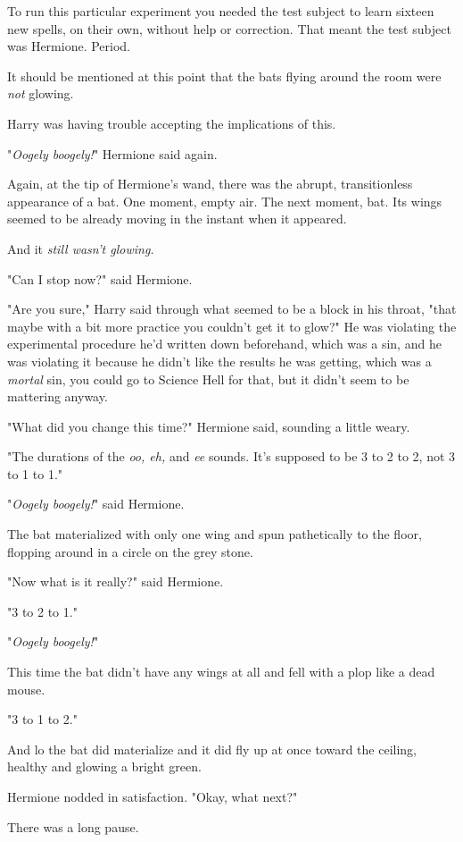 To run this particular experiment you needed the test subject to learn sixteen
new spells, on their own, without help or correction. That meant the test
subject was Hermione. Period.

It should be mentioned at this point that the bats flying around the room were
\emph{not} glowing.

Harry was having trouble accepting the implications of this.

"\emph{Oogely boogely!}" Hermione said again.

Again, at the tip of Hermione's wand, there was the abrupt, transitionless
appearance of a bat. One moment, empty air. The next moment, bat. Its wings
seemed to be already moving in the instant when it appeared.

And it \emph{still wasn't glowing.}

"Can I stop now?" said Hermione.

"Are you sure," Harry said through what seemed to be a block in his throat,
"that maybe with a bit more practice you couldn't get it to glow?" He was
violating the experimental procedure he'd written down beforehand, which was a
sin, and he was violating it because he didn't like the results he was getting,
which was a \emph{mortal} sin, you could go to Science Hell for that, but it
didn't seem to be mattering anyway.

"What did you change this time?" Hermione said, sounding a little weary.

"The durations of the \emph{oo, eh,} and \emph{ee} sounds. It's supposed to be
3 to 2 to 2, not 3 to 1 to 1."

"\emph{Oogely boogely!}" said Hermione.

The bat materialized with only one wing and spun pathetically to the floor,
flopping around in a circle on the grey stone.

"Now what is it really?" said Hermione.

"3 to 2 to 1."

"\emph{Oogely boogely!}"

This time the bat didn't have any wings at all and fell with a plop like a dead
mouse.

"3 to 1 to 2."

And lo the bat did materialize and it did fly up at once toward the ceiling,
healthy and glowing a bright green.

Hermione nodded in satisfaction. "Okay, what next?"

There was a long pause.

